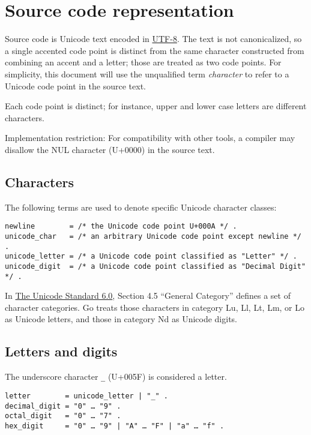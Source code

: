 \section*{Source code representation}

Source code is Unicode text encoded in
\href{http://en.wikipedia.org/wiki/UTF-8}{UTF-8}. The text is not
canonicalized, so a single accented code point is distinct from the same
character constructed from combining an accent and a letter; those are
treated as two code points. For simplicity, this document will use the
unqualified term \emph{character} to refer to a Unicode code point in
the source text.

Each code point is distinct; for instance, upper and lower case letters
are different characters.

Implementation restriction: For compatibility with other tools, a
compiler may disallow the NUL character (U+0000) in the source text.

\subsection*{Characters}

The following terms are used to denote specific Unicode character
classes:

\begin{Verbatim}[frame=single]
newline        = /* the Unicode code point U+000A */ .
unicode_char   = /* an arbitrary Unicode code point except newline */ .
unicode_letter = /* a Unicode code point classified as "Letter" */ .
unicode_digit  = /* a Unicode code point classified as "Decimal Digit" */ .
\end{Verbatim}

In \href{http://www.unicode.org/versions/Unicode6.0.0/}{The Unicode
Standard 6.0}, Section 4.5 ``General Category'' defines a set of
character categories. Go treats those characters in category Lu, Ll, Lt,
Lm, or Lo as Unicode letters, and those in category Nd as Unicode
digits.

\subsection*{Letters and digits}

The underscore character \texttt{\_} (U+005F) is considered a letter.

\begin{Verbatim}[frame=single]
letter        = unicode_letter | "_" .
decimal_digit = "0" … "9" .
octal_digit   = "0" … "7" .
hex_digit     = "0" … "9" | "A" … "F" | "a" … "f" .
\end{Verbatim}

